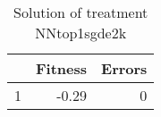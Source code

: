 \begin{table}[ht]
\centering
\begin{tabular}{rrr}
  \hline
 & Fitness & Errors \\ 
  \hline
1 & -0.29 &   0 \\ 
   \hline
\end{tabular}
\caption{Solution of treatment NNtop1sgde2k} 
\end{table}
